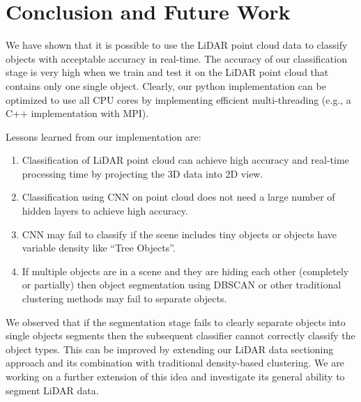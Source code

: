 \section{Conclusion and Future Work}\label{sec:conclusion}
We have shown that it is possible to use the LiDAR point cloud data to classify objects with
acceptable accuracy in real-time. The accuracy of our classification stage is very high when we train and test it on the LiDAR point 
cloud that contains only one single object. Clearly, our python implementation can be optimized to
use all CPU cores by implementing efficient multi-threading (e.g., a C++ implementation with MPI).

Lessons learned from our implementation are:
\begin{enumerate}
  \item Classification of LiDAR point cloud can achieve high accuracy and real-time processing time by projecting the 3D data into 2D view.
  \item Classification using CNN on point cloud does not need a large number of hidden layers to achieve high accuracy.
  \item CNN may fail to classify if the scene includes tiny objects or objects have variable density like ``Tree Objects''.
  \item If multiple objects are in a scene and they are hiding each other (completely or partially) then object segmentation using DBSCAN
  or other traditional clustering methods may fail to separate objects.
\end{enumerate}

We observed that if the segmentation stage fails to clearly separate objects into single objects segments then the subsequent classifier 
cannot correctly classify the object types. This can be improved by extending our LiDAR data sectioning approach and its combination 
with traditional density-based clustering. We are working on a further extension of this idea and investigate its general ability to segment LiDAR data.
